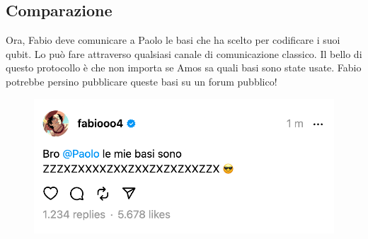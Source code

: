 \documentclass[a4paper]{article}
\begin{document}
\subsection{Comparazione}

Ora, Fabio deve comunicare a Paolo le basi che ha scelto per codificare i suoi qubit. 
Lo può fare attraverso qualsiasi canale di comunicazione classico. Il bello di questo protocollo
è che non importa se Amos sa quali basi sono state usate. Fabio potrebbe persino pubblicare queste basi
su un forum pubblico!

\begin{figure}[H]
  \centering
  \includegraphics[width=1\textwidth]{post.png}
  \label{fig:post}
\end{figure}
\end{document}
